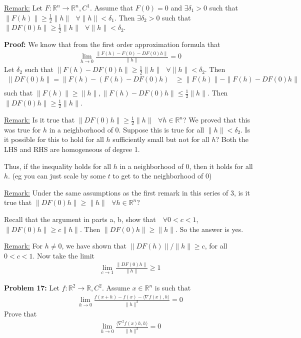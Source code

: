 \documentclass{article}
\newcommand*{\txt}[1]{\text{ #1 }}%
\newcommand*{\iprod}[1]{\langle #1 \rangle}
\newcommand*{\fora}{\txt{}\forall}%
\newcommand*{\rr}{\mathbb{R}}%
\begin{document}
\underline{Remark:} Let $F:\rr^n\to\rr^n, C^1$. Assume that $F(0)=0$ and $\exists \delta_1>0$ such that $\|F(h)\|\geq \frac{1}{2}\|h\|\fora \|h\|<\delta_1$. Then $\exists \delta_2>0$ such that $\|DF(0)h\|\geq \frac{1}{2} \|h\|\fora \|h\|<\delta_2$.

\textbf{Proof:} We know that from the first order approximation formula that \begin{align*}
    \lim_{h\to 0} \frac{\|F(h)-F(0)-DF(0)h\|}{\|h\|}=0
\end{align*} Let $\delta_2$ such that $\|F(h)-DF(0)h\|\geq \frac{1}{2}\|h\|\fora \|h\|<\delta_2$. Then \begin{align*}
    \|DF(0)h\|=\|F(h)-(F(h)-DF(0)h)&\geq \|F(h)\|-\|F(h)-DF(0)h\|\\
\end{align*} such that $\|F(h)\|\geq \|h\|, \|F(h)-DF(0)h\|\leq \frac{1}{2}\|h\|$. Then $\|DF(0)h\|\geq \frac{1}{2}\|h\|$.

\underline{Remark:} Is it true that $\|DF(0)h\|\geq \frac{1}{2}\|h\|\fora h\in \rr^n$? We proved that this was true for $h$ in a neighborhood of 0. Suppose this is true for all $\|h\|<\delta_2$. Is it possible for this to hold for all $h$ sufficiently small but not for all $h$? Both the LHS and RHS are homogeneous of degree 1. 

Thus, if the inequality holds for all $h$ in a neighborhood of 0, then it holds for all $h$. (eg you can just scale by some $t$ to get to the neighborhood of 0)

\underline{Remark:} Under the same assumptions as the first remark in this series of 3, is it true that $\|DF(0)h\|\geq \|h\|\fora h\in \rr^n$? 

Recall that the argument in parts a, b, show that $\fora 0<c<1$, $\|DF(0)h\|\geq c\|h\|$. Then $\|DF(0)h\|\geq \|h\|$. So the answer is yes.

\underline{Remark:} For $h\neq 0$, we have shown that $\|DF(h)\|/\|h\|\geq c$, for all $0<c<1$. Now take the limit \begin{align*}
    \lim_{c\to 1}\frac{\|DF(0)h\|}{\|h\|}\geq 1
\end{align*}

\textbf{Problem 17:} Let $f:\rr^2\to \rr, C^2$. Assume $x\in \rr^n$ is such that \begin{align*}
    \lim_{h\to 0}\frac{f(x+h)-f(x)-\iprod{\nabla f(x),h}}{\|h\|^2}=0
\end{align*} Prove that \begin{align*}
    \lim_{h\to 0}\frac{\iprod{\nabla^2 f(x)h,h}}{\|h\|^2}=0
\end{align*}
\end{document}
